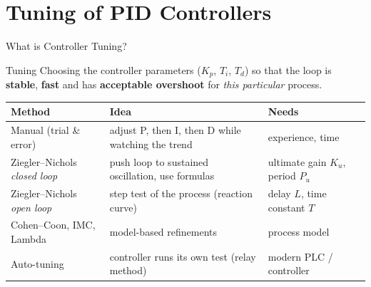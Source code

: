 \documentclass[aspectratio=169]{beamer}
\begin{document}
	\section{Tuning of PID Controllers}
	\begin{frame}{What is Controller Tuning?}
		\begin{block}{Tuning}
			Choosing the controller parameters ($K_p$, $T_i$, $T_d$) so that the loop is \textbf{stable}, \textbf{fast} and has \textbf{acceptable overshoot} for \emph{this particular} process.
		\end{block}
		\vspace{0.05cm}
		\renewcommand{\arraystretch}{1.12}
		\centering
		\footnotesize
		\begin{tabular}{@{}>{\raggedright}p{3.4cm}>{\raggedright}p{5.6cm}>{\raggedright\arraybackslash}p{3.6cm}@{}}
			\toprule
			\textbf{Method} & \textbf{Idea} & \textbf{Needs} \\
			\midrule
			Manual (trial \& error) & adjust P, then I, then D while watching the trend & experience, time \\
			Ziegler--Nichols \emph{closed loop} & push loop to sustained oscillation, use formulas & ultimate gain $K_u$, period $P_u$ \\
			Ziegler--Nichols \emph{open loop} & step test of the process (reaction curve) & delay $L$, time constant $T$ \\
			Cohen--Coon, IMC, Lambda & model-based refinements & process model \\
			Auto-tuning & controller runs its own test (relay method) & modern PLC / controller \\
			\bottomrule
		\end{tabular}
	\end{frame}
\end{document}
